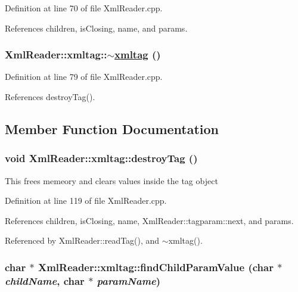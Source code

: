 Definition at line 70 of file Xml\-Reader.cpp.

References children, is\-Closing, name, and params.\hypertarget{classXmlReader_1_1xmltag_a1}{
\subsubsection[$\sim$xmltag]{\setlength{\rightskip}{0pt plus 5cm}Xml\-Reader::xmltag::$\sim$\hyperlink{classXmlReader_1_1xmltag}{xmltag} ()}}
\label{classXmlReader_1_1xmltag_a1}




Definition at line 79 of file Xml\-Reader.cpp.

References destroy\-Tag().

\subsection{Member Function Documentation}
\hypertarget{classXmlReader_1_1xmltag_b1}{
\subsubsection[destroyTag]{\setlength{\rightskip}{0pt plus 5cm}void Xml\-Reader::xmltag::destroy\-Tag ()}}
\label{classXmlReader_1_1xmltag_b1}


This frees memeory and clears values inside the tag object 

Definition at line 119 of file Xml\-Reader.cpp.

References children, is\-Closing, name, Xml\-Reader::tagparam::next, and params.

Referenced by Xml\-Reader::read\-Tag(), and $\sim$xmltag().\hypertarget{classXmlReader_1_1xmltag_a5}{
\subsubsection[findChildParamValue]{\setlength{\rightskip}{0pt plus 5cm}char $\ast$ Xml\-Reader::xmltag::find\-Child\-Param\-Value (char $\ast$ {\em child\-Name}, char $\ast$ {\em param\-Name})}}
\label{classXmlReader_1_1xmltag_a5}


